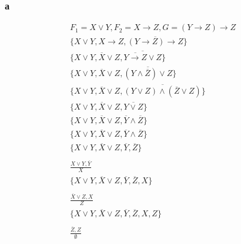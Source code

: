 \documentclass[12pt]{article}
\begin{document}
\subsubsection{а}
\begin{gather*}
  F_1 = X \vee Y, F_2 = X \rightarrow Z, G = \left( Y \rightarrow Z \right) \rightarrow Z \\
  \{X \vee Y, X \rightarrow Z, \overline{\left( Y \rightarrow Z \right) \rightarrow Z } \} \\
  \{X \vee Y, \overline{X} \vee Z, \overline{  \overline{ Y \rightarrow Z } \vee Z } \} \\
  \{X \vee Y, \overline{X} \vee Z, \overline{ \left( Y \wedge \overline{Z} \right) \vee Z } \} \\
  \{X \vee Y, \overline{X} \vee Z, \overline{ \left( Y \vee Z \right) \wedge \left( \overline{Z} \vee Z \right) } \} \\
  \{X \vee Y, \overline{X} \vee Z, \overline{ Y \vee Z } \} \\
  \{X \vee Y, \overline{X} \vee Z,  \overline{Y} \wedge \overline{Z} \} \\
  \{X \vee Y, \overline{X} \vee Z,  \overline{Y} \wedge \overline{Z} \} \\
  \{X \vee Y, \overline{X} \vee Z,  \overline{Y}, \overline{Z} \} \\
  \\
  \frac{X \vee Y, \overline{Y}}{X} \\
  \{X \vee Y, \overline{X} \vee Z,  \overline{Y}, \overline{Z}, X \} \\
  \\
  \frac{\overline{X} \vee Z, X}{Z} \\
  \{X \vee Y, \overline{X} \vee Z,  \overline{Y}, \overline{Z}, X, Z \} \\
  \\
  \frac{\overline{Z}, Z}{\emptyset} \\
\end{gather*}
\end{document}
